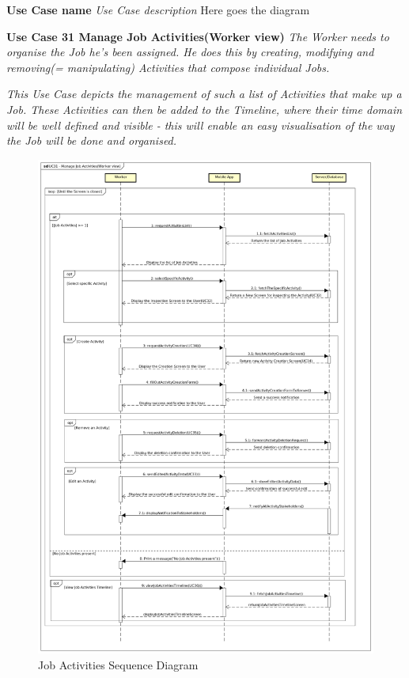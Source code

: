 				\textbf{Use Case name}
				\textit{Use Case description}
				Here goes the diagram
				
				\textbf{Use Case 31 Manage Job Activities(Worker view)}
				\textit{The Worker needs to organise the Job he's been assigned. He does this by creating, modifying and removing(= manipulating) Activities that compose individual Jobs.}
					
				\textit{This Use Case depicts the management of such a list of Activities that make up a Job. These Activities can then be added to the Timeline, where their time domain will be well defined and visible - this will enable an easy visualisation of the way the Job will be done and organised.}
				\begin{figure}[H]
					\includegraphics[width=\linewidth]{diagrams/sd-diag0-jobact.png}
					\caption{Job Activities Sequence Diagram}
					\label{fig:sd0_job_activities}
				\end{figure}
				
